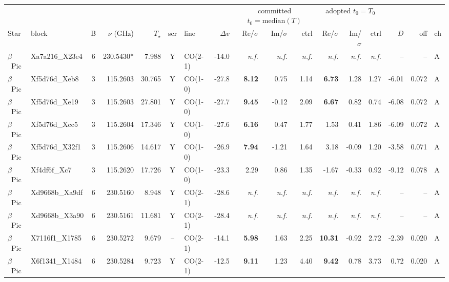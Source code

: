 \begin{tabular}{@{}l@{~}l@{~}c@{~}r@{~}r@{~}c@{~}l@{~}r@{~~}r@{~}r@{~}r@{~~}r@{~}r@{~}r@{~~}r@{~}r@{~}l@{}}
\hline
& & & & & & & & \multicolumn{3}{c}{committed $t_0=\mathrm{median}(T)$} & \multicolumn{3}{c}{adopted $t_0=T_0$} & & & \\
Star & block & B & $\nu$ (GHz) & $T_\star$ & scr & line & $\Delta v$ & Re/$\sigma$ & Im/$\sigma$ & ctrl & Re/$\sigma$ & Im/$\sigma$ & ctrl & $D$ & off & ch \\
\hline
$\beta$~Pic & Xa7a216\_X23e4 & 6 & 230.5430* & 7.988 & Y & CO(2-1) & -14.0 & \emph{n.f.} & \emph{n.f.} & \emph{n.f.} & \emph{n.f.} & \emph{n.f.} & \emph{n.f.} & -- & -- & A \\
$\beta$~Pic & Xf5d76d\_Xeb8 & 3 & 115.2603 & 30.765 & Y & CO(1-0) & -27.8 & \textbf{8.12} & 0.75 & 1.14 & \textbf{6.73} & 1.28 & 1.27 & -6.01 & 0.072 & A \\
$\beta$~Pic & Xf5d76d\_Xe19 & 3 & 115.2603 & 27.801 & Y & CO(1-0) & -27.7 & \textbf{9.45} & -0.12 & 2.09 & \textbf{6.67} & 0.82 & 0.74 & -6.08 & 0.072 & A \\
$\beta$~Pic & Xf5d76d\_Xcc5 & 3 & 115.2604 & 17.346 & Y & CO(1-0) & -27.6 & \textbf{6.16} & 0.47 & 1.77 & 1.53 & 0.41 & 1.86 & -6.09 & 0.072 & A \\
$\beta$~Pic & Xf5d76d\_X32f1 & 3 & 115.2606 & 14.617 & Y & CO(1-0) & -26.9 & \textbf{7.94} & -1.21 & 1.64 & 3.18 & -0.09 & 1.20 & -3.58 & 0.071 & A \\
$\beta$~Pic & Xf4df6f\_Xc7 & 3 & 115.2620 & 17.726 & Y & CO(1-0) & -23.3 & 2.29 & 0.86 & 1.35 & -1.67 & -0.33 & 0.92 & -9.12 & 0.078 & A \\
$\beta$~Pic & Xd9668b\_Xa9df & 6 & 230.5160 & 8.948 & Y & CO(2-1) & -28.6 & \emph{n.f.} & \emph{n.f.} & \emph{n.f.} & \emph{n.f.} & \emph{n.f.} & \emph{n.f.} & -- & -- & A \\
$\beta$~Pic & Xd9668b\_X3a90 & 6 & 230.5161 & 11.681 & Y & CO(2-1) & -28.4 & \emph{n.f.} & \emph{n.f.} & \emph{n.f.} & \emph{n.f.} & \emph{n.f.} & \emph{n.f.} & -- & -- & A \\
$\beta$~Pic & X7116f1\_X1785 & 6 & 230.5272 & 9.679 & -- & CO(2-1) & -14.1 & \textbf{5.98} & 1.63 & 2.25 & \textbf{10.31} & -0.92 & 2.72 & -2.39 & 0.020 & A \\
$\beta$~Pic & X6f1341\_X1484 & 6 & 230.5284 & 9.723 & Y & CO(2-1) & -12.5 & \textbf{9.11} & 1.23 & 4.40 & \textbf{9.42} & 0.78 & 3.73 & 0.72 & 0.020 & A \\

\end{tabular}
